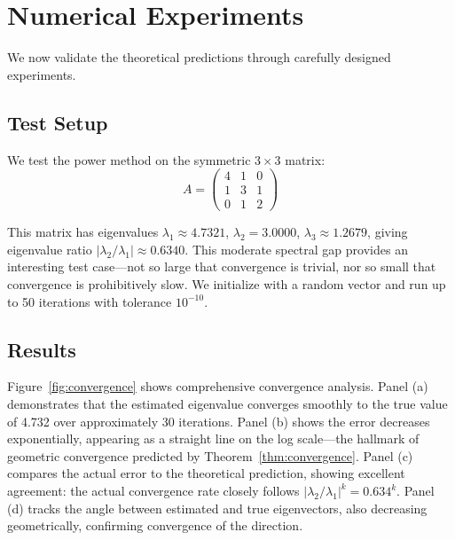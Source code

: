 \documentclass[11pt,a4paper]{article}
\begin{document}
\section{Numerical Experiments}
\label{sec:experiments}

We now validate the theoretical predictions through carefully designed experiments.

\subsection{Test Setup}

We test the power method on the symmetric $3 \times 3$ matrix:
$$A = \begin{pmatrix} 4 & 1 & 0 \\ 1 & 3 & 1 \\ 0 & 1 & 2 \end{pmatrix}$$

This matrix has eigenvalues $\lambda_1 \approx 4.7321$, $\lambda_2 = 3.0000$, $\lambda_3 \approx 1.2679$, giving eigenvalue ratio $|\lambda_2/\lambda_1| \approx 0.6340$. This moderate spectral gap provides an interesting test case—not so large that convergence is trivial, nor so small that convergence is prohibitively slow. We initialize with a random vector and run up to 50 iterations with tolerance $10^{-10}$.

\subsection{Results}

Figure~\ref{fig:convergence} shows comprehensive convergence analysis. Panel (a) demonstrates that the estimated eigenvalue converges smoothly to the true value of 4.732 over approximately 30 iterations. Panel (b) shows the error decreases exponentially, appearing as a straight line on the log scale—the hallmark of geometric convergence predicted by Theorem~\ref{thm:convergence}. Panel (c) compares the actual error to the theoretical prediction, showing excellent agreement: the actual convergence rate closely follows $|\lambda_2/\lambda_1|^k = 0.634^k$. Panel (d) tracks the angle between estimated and true eigenvectors, also decreasing geometrically, confirming convergence of the direction.
\end{document}
